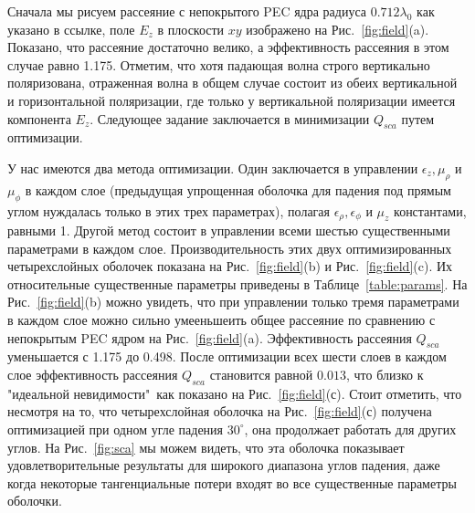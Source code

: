 \documentclass[a4paper, 12pt]{article}
\begin{document}
Сначала мы рисуем рассеяние с непокрытого PEC ядра радиуса $0.712\lambda_0$
как указано в ссылке, поле $E_z$ в плоскости $xy$ изображено на 
Рис.~\ref{fig:field}(a). Показано, что рассеяние достаточно велико, а 
эффективность рассеяния в этом случае равно 1.175. Отметим, что хотя 
падающая волна строго вертикально поляризована, отраженная волна в общем
случае состоит из обеих вертикальной и горизонтальной поляризации, где
только у вертикальной поляризации имеется компонента $E_z$. Следующее задание 
заключается в минимизации $Q_{sca}$ путем оптимизации.

У нас имеются два метода оптимизации. Один заключается в управлении 
$\epsilon_z, \mu_\rho$ и $\mu_\phi$ в каждом слое (предыдущая упрощенная
оболочка для падения под прямым углом \cite{3} нуждалась только в этих трех 
параметрах), полагая $\epsilon_\rho, \epsilon_\phi$ и $\mu_z$ константами,
равными 1. Другой метод состоит в управлении всеми шестью существенными 
параметрами в каждом слое. Производительность этих двух оптимизированных
четырехслойных оболочек показана на Рис.~\ref{fig:field}(b) и 
Рис.~\ref{fig:field}(c). Их относительные существенные параметры приведены
в Таблице~\ref{table:params}. На Рис.~\ref{fig:field}(b) можно увидеть,
что при управлении только тремя параметрами в каждом слое можно сильно
умееньшеить общее рассеяние по сравнению с непокрытым PEC ядром на 
Рис.~\ref{fig:field}(a). Эффективность рассеяния $Q_{sca}$ 
уменьшается с 1.175 до 0.498. После оптимизации всех шести слоев в каждом слое
эффективность рассеяния $Q_{sca}$ становится равной $0.013$, что близко
к "идеальной невидимости"\, как показано на Рис.~\ref{fig:field}(с).
Стоит отметить, что несмотря на то, что четырехслойная оболочка на 
Рис.~\ref{fig:field}(с) получена оптимизацией при одном угле падения 
$30^\circ$, она продолжает работать для других углов. На Рис.~\ref{fig:sca}
мы можем видеть, что эта оболочка показывает удовлетворительные результаты для
широкого диапазона углов падения, даже когда некоторые тангенциальные потери
входят во все существенные параметры оболочки.
\end{document}
